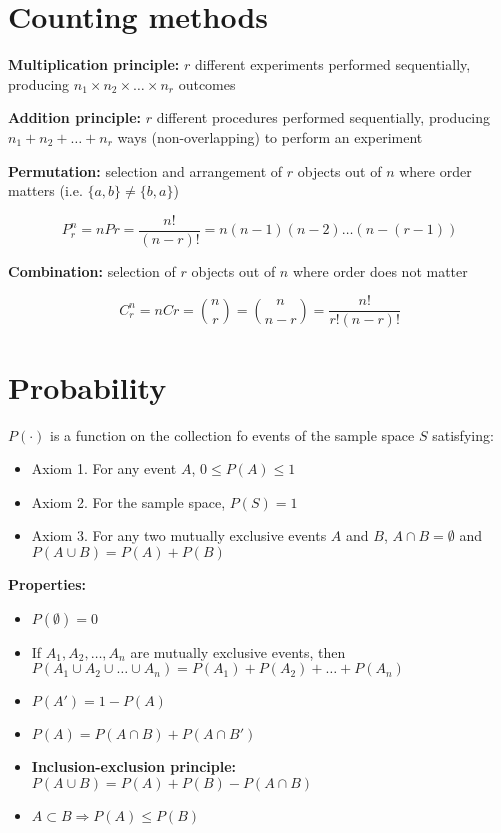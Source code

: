 \documentclass[twocolumn, 8pt]{extarticle}
\begin{document}
\section*{Counting methods}\noindent

\textbf{Multiplication principle:} $r$ different experiments performed sequentially, producing $n_1 \times n_2 \times \ldots \times n_r$ outcomes

\textbf{Addition principle:} $r$ different procedures performed sequentially, producing $n_1 + n_2 + \ldots + n_r$ ways (non-overlapping) to perform an experiment

\textbf{Permutation:} selection and arrangement of $r$ objects out of $n$ where order matters (i.e. $\{a, b\} \neq \{b, a\}$)

$$
P^n_r = nPr = \frac{n!}{(n-r)!} = n(n-1)(n-2)\ldots(n-(r-1))
$$

\textbf{Combination:} selection of $r$ objects out of $n$ where order does not matter

$$
C^n_r = nCr = {n \choose r} = {n \choose n - r} = \frac{n!}{r!(n-r)!}
$$

\section*{Probability}\noindent

$P(\cdot)$ is a function on the collection fo events of the sample space $S$ satisfying:

\begin{itemize}
    \item Axiom 1. For any event $A$, $0 \leq P(A) \leq 1$
    \item Axiom 2. For the sample space, $P(S) = 1$
    \item Axiom 3. For any two mutually exclusive events $A$ and $B$, $A \cap B = \emptyset$ and $P(A \cup B) = P(A) + P(B)$
\end{itemize}

\textbf{Properties:}

\begin{itemize}
    \item $P(\emptyset) = 0$
    \item If $A_1, A_2, \ldots, A_n$ are mutually exclusive events, then $P(A_1 \cup A_2 \cup \ldots \cup A_n) = P(A_1) + P(A_2) + \ldots + P(A_n)$
    \item $P(A') = 1 - P(A)$
    \item $P(A) = P(A \cap B) + P(A \cap B')$
    \item \textbf{Inclusion-exclusion principle:} $P(A \cup B) = P(A) + P(B) - P(A \cap B)$
    \item $A \subset B \Rightarrow P(A) \leq P(B)$
\end{itemize}
\end{document}
